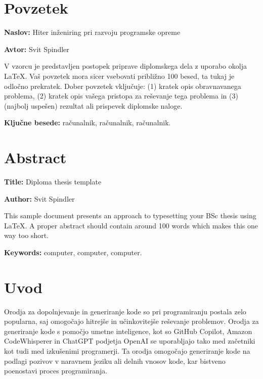 \documentclass[a4paper,12pt,openright]{book}
\newcommand{\ttitle}{Hiter inženiring pri razvoju programske opreme}
\newcommand{\ttitleEn}{Diploma thesis template}
\newcommand{\tauthor}{Svit Spindler}
\newcommand{\tkeywords}{računalnik, računalnik, računalnik}
\newcommand{\tkeywordsEn}{computer, computer, computer}
\newcommand{\clearemptydoublepage}{\newpage{\pagestyle{empty}\cleardoublepage}}
\begin{document}
\clearemptydoublepage

{}
\chapter*{Povzetek}

\noindent\textbf{Naslov:} \ttitle
\bigskip

\noindent\textbf{Avtor:} \tauthor
\bigskip

\noindent V vzorcu je predstavljen postopek priprave diplomskega dela z uporabo okolja \LaTeX. Vaš povzetek mora sicer vsebovati približno 100 besed, ta tukaj je odločno prekratek.
Dober povzetek vključuje: (1) kratek opis obravnavanega problema, (2) kratek opis vašega pristopa za reševanje tega problema in (3) (najbolj uspešen) rezultat ali prispevek diplomske naloge.

\bigskip

\noindent\textbf{Ključne besede:} \tkeywords.
\clearemptydoublepage

{}
\chapter*{Abstract}

\noindent\textbf{Title:} \ttitleEn
\bigskip

\noindent\textbf{Author:} \tauthor
\bigskip

\noindent This sample document presents an approach to typesetting your BSc thesis using \LaTeX. 
A proper abstract should contain around 100 words which makes this one way too short.
\bigskip

\noindent\textbf{Keywords:} \tkeywordsEn.
\clearemptydoublepage


\chapter{Uvod}

Orodja za dopolnjevanje in generiranje kode so pri programiranju postala zelo popularna, saj omogočajo hitrejše in učinkovitejše reševanje problemov. Orodja za generiranje kode s pomočjo umetne inteligence, kot so GitHub Copilot, Amazon CodeWhisperer in ChatGPT podjetja OpenAI se uporabljajo tako med začetniki kot tudi med izkušenimi programerji. Ta orodja omogočajo generiranje kode na podlagi pozivov v naravnem jeziku ali delnih vnosov kode, kar bistveno poenostavi proces programiranja.
\end{document}
